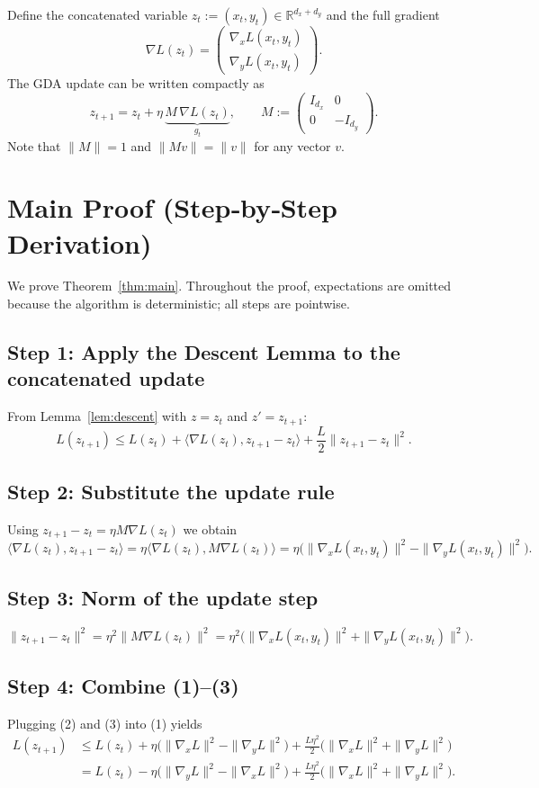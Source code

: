 \documentclass[11pt]{article}
\newcommand{\R}{\mathbb{R}}
\begin{document}
Define the concatenated variable \(z_{t}:=(x_{t},y_{t})\in\R^{d_{x}+d_{y}}\) and the full gradient
\[
\nabla L(z_{t})=
\begin{pmatrix}
\nabla_{x}L(x_{t},y_{t})\\[2pt]
\nabla_{y}L(x_{t},y_{t})
\end{pmatrix}.
\]
The GDA update can be written compactly as
\[
z_{t+1}=z_{t}+ \eta\,\underbrace{M\,\nabla L(z_{t})}_{\displaystyle g_{t}},\qquad
M:=\begin{pmatrix}
I_{d_{x}} & 0\\
0 & -I_{d_{y}}
\end{pmatrix}.
\]
Note that \(\|M\|=1\) and \(\|M v\|=\|v\|\) for any vector \(v\).

\section*{Main Proof (Step‑by‑Step Derivation)}
We prove Theorem~\ref{thm:main}. Throughout the proof, expectations are omitted because the algorithm is deterministic; all steps are pointwise.

\subsection*{Step 1: Apply the Descent Lemma to the concatenated update}
From Lemma~\ref{lem:descent} with \(z=z_{t}\) and \(z'=z_{t+1}\):
\[
L(z_{t+1})\le L(z_{t})+\langle\nabla L(z_{t}),z_{t+1}-z_{t}\rangle
+\frac{L}{2}\|z_{t+1}-z_{t}\|^{2}. \tag{1}
\]

\subsection*{Step 2: Substitute the update rule}
Using \(z_{t+1}-z_{t}= \eta M\nabla L(z_{t})\) we obtain
\[
\langle\nabla L(z_{t}),z_{t+1}-z_{t}\rangle
= \eta\langle\nabla L(z_{t}),M\nabla L(z_{t})\rangle
= \eta\big(\|\nabla_{x}L(x_{t},y_{t})\|^{2}
-\|\nabla_{y}L(x_{t},y_{t})\|^{2}\big). \tag{2}
\]

\subsection*{Step 3: Norm of the update step}
\[
\|z_{t+1}-z_{t}\|^{2}
= \eta^{2}\|M\nabla L(z_{t})\|^{2}
= \eta^{2}\big(\|\nabla_{x}L(x_{t},y_{t})\|^{2}
+\|\nabla_{y}L(x_{t},y_{t})\|^{2}\big). \tag{3}
\]

\subsection*{Step 4: Combine (1)–(3)}
Plugging (2) and (3) into (1) yields
\[
\begin{aligned}
L(z_{t+1})
&\le L(z_{t})
+\eta\big(\|\nabla_{x}L\|^{2}-\|\nabla_{y}L\|^{2}\big)
+\frac{L\eta^{2}}{2}\big(\|\nabla_{x}L\|^{2}+\|\nabla_{y}L\|^{2}\big)\\
&= L(z_{t})
-\eta\big(\|\nabla_{y}L\|^{2}-\|\nabla_{x}L\|^{2}\big)
+\frac{L\eta^{2}}{2}\big(\|\nabla_{x}L\|^{2}+\|\nabla_{y}L\|^{2}\big). \tag{4}
\end{aligned}
\]
\end{document}
